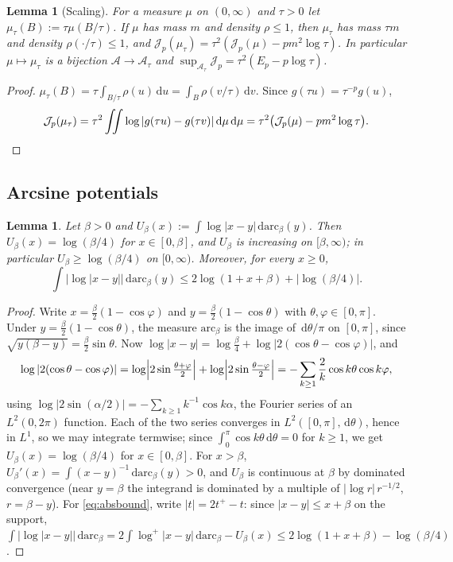 \documentclass{amsart}
\newtheorem{lemma}[theorem]{Lemma}
\theoremstyle{definition}
\theoremstyle{remark}
\numberwithin{equation}{section}
\newcommand{\cA}{\mathcal{A}}
\newcommand{\cJ}{\mathcal{J}}
\newcommand{\dd}{\,\mathrm{d}}
\newcommand{\arc}{\mathrm{arc}}
\begin{document}
\begin{lemma}[Scaling]\label{lem:scaling}
For a measure $\mu$ on $(0,\infty)$ and $\tau>0$ let $\mu_\tau(B):=\tau\mu(B/\tau)$. If $\mu$ has mass $m$ and
density $\rho\le1$, then $\mu_\tau$ has mass $\tau m$ and density $\rho(\cdot/\tau)\le1$, and
$\cJ_p(\mu_\tau)=\tau^2(\cJ_p(\mu)-pm^2\log\tau)$. In particular $\mu\mapsto\mu_\tau$ is a bijection
$\cA\to\cA_\tau$ and $\sup_{\cA_\tau}\cJ_p=\tau^2(E_p-p\log\tau)$.
\end{lemma}

\begin{proof}
$\mu_\tau(B)=\tau\int_{B/\tau}\rho(u)\dd u=\int_B\rho(v/\tau)\dd v$. Since $g(\tau u)=\tau^{-p}g(u)$,
\[
  \cJ_p(\mu_\tau)=\tau^2\iint\log|g(\tau u)-g(\tau v)|\dd\mu\dd\mu=\tau^2\bigl(\cJ_p(\mu)-pm^2\log\tau\bigr).
  \qedhere
\]
\end{proof}

\subsection{Arcsine potentials}
\begin{lemma}\label{lem:arcsine}
Let $\beta>0$ and $U_\beta(x):=\int\log|x-y|\dd\arc_\beta(y)$. Then $U_\beta(x)=\log(\beta/4)$ for
$x\in[0,\beta]$, and $U_\beta$ is increasing on $[\beta,\infty)$; in particular $U_\beta\ge\log(\beta/4)$ on
$[0,\infty)$. Moreover, for every $x\ge0$,
\begin{equation}\label{eq:absbound}
  \int\bigl|\log|x-y|\bigr|\dd\arc_\beta(y)\le2\log(1+x+\beta)+\bigl|\log(\beta/4)\bigr| .
\end{equation}
\end{lemma}

\begin{proof}
Write $x=\frac\beta2(1-\cos\varphi)$ and $y=\frac\beta2(1-\cos\theta)$ with $\theta,\varphi\in[0,\pi]$. Under
$y=\frac\beta2(1-\cos\theta)$, the measure $\arc_\beta$ is the image of $\dd\theta/\pi$ on $[0,\pi]$, since
$\sqrt{y(\beta-y)}=\frac\beta2\sin\theta$. Now
$\log|x-y|=\log\frac\beta4+\log|2(\cos\theta-\cos\varphi)|$, and
\[
  \log|2(\cos\theta-\cos\varphi)|=\log\Bigl|2\sin\tfrac{\theta+\varphi}{2}\Bigr|
  +\log\Bigl|2\sin\tfrac{\theta-\varphi}{2}\Bigr|
  =-\sum_{k\ge1}\frac2k\cos k\theta\cos k\varphi,
\]
using $\log|2\sin(\alpha/2)|=-\sum_{k\ge1}k^{-1}\cos k\alpha$, the Fourier series of an $L^2(0,2\pi)$ function.
Each of the two series converges in $L^2([0,\pi],\dd\theta)$, hence in $L^1$, so we may integrate termwise; since
$\int_0^\pi\cos k\theta\dd\theta=0$ for $k\ge1$, we get $U_\beta(x)=\log(\beta/4)$ for $x\in[0,\beta]$. For
$x>\beta$, $U_\beta'(x)=\int(x-y)^{-1}\dd\arc_\beta(y)>0$, and $U_\beta$ is continuous at $\beta$ by dominated
convergence (near $y=\beta$ the integrand is dominated by a multiple of $|\log r|\,r^{-1/2}$, $r=\beta-y$). For
\eqref{eq:absbound}, write $|t|=2t^+-t$: since $|x-y|\le x+\beta$ on the support,
$\int|\log|x-y||\dd\arc_\beta=2\int\log^+|x-y|\dd\arc_\beta-U_\beta(x)\le2\log(1+x+\beta)-\log(\beta/4)$.
\end{proof}
\end{document}
